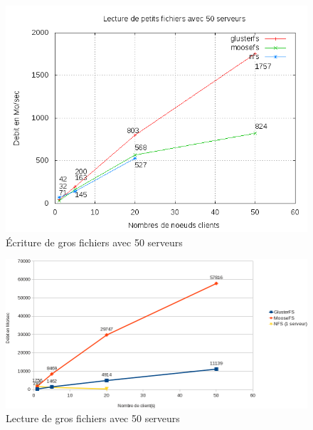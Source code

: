 \documentclass[12pt]{report}
\begin{document}
\begin{figure}[H]
\begin{center}
\includegraphics[bb=0 0 640 480,width=14cm]{images/srv50rs2.png}
\caption{Écriture de gros fichiers avec 50 serveurs}
\end{center}
\end{figure} 
		        \begin{figure}[H]
			        \begin{center}
				        \includegraphics[width=1\linewidth]{graph/calc/50RB.png}
				        \caption{Lecture de gros fichiers avec 50 serveurs}
			        \end{center}
		        \end{figure}
\end{document}
